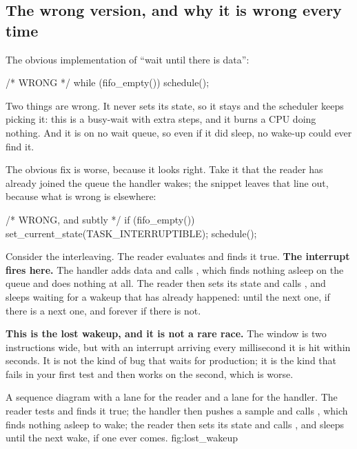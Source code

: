 \subsection{The wrong version, and why it is wrong every time}
\label{c9:app:a2}

The obvious implementation of ``wait until there is data'':

\begin{ccode}
/* WRONG */
while (fifo_empty())
        schedule();
\end{ccode}

\noindent Two things are wrong. It never sets its state, so it stays  and the
scheduler keeps picking it: this is a busy-wait with extra steps, and it burns a CPU doing nothing.
And it is on no wait queue, so even if it did sleep, no wake-up could ever find it.

The obvious fix is worse, because it looks right. Take it that the reader has already joined the
queue the handler wakes; the snippet leaves that line out, because what is wrong is elsewhere:

\begin{ccode}
/* WRONG, and subtly */
if (fifo_empty()) {
        set_current_state(TASK_INTERRUPTIBLE);
        schedule();
}
\end{ccode}

\noindent Consider the interleaving. The reader evaluates  and finds it true.
\textbf{The interrupt fires here.} The handler adds data and calls ,
which finds nothing asleep on the queue and does nothing at all. The reader then sets its state and
calls , and sleeps waiting for a wakeup that has already happened: until the next
one, if there is a next one, and forever if there is not.

\textbf{This is the lost wakeup, and it is not a rare race.} The window is two instructions wide,
but with an interrupt arriving every millisecond it is hit within seconds. It is not the kind of bug
that waits for production; it is the kind that fails in your first test and then works on the
second, which is worse.

  {A sequence diagram with a lane for the reader and a lane for the handler. The reader tests
    and finds it true; the handler then pushes a sample and calls ,
   which finds nothing asleep to wake; the reader then sets its state and calls , and
   sleeps until the next wake, if one ever comes.}
  {fig:lost_wakeup}

